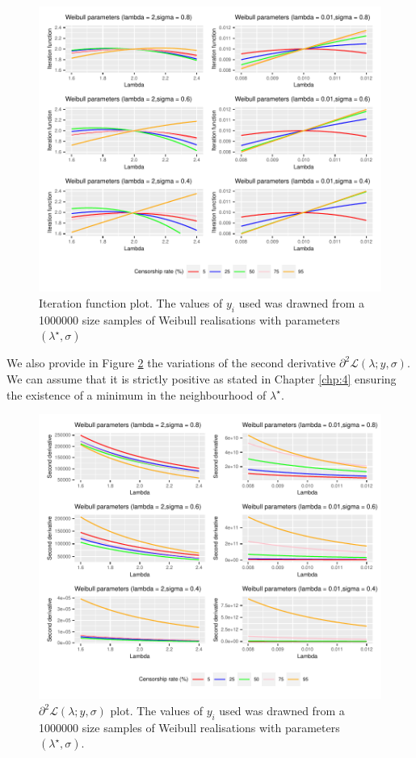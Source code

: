 \begin{appendices}
\begin{figure}[ht]
    \centering
    \includegraphics{figs/App/ite_function.pdf}
    \caption{Iteration function plot. The values of $y_i$ used was drawned from a 1000000 size samples of Weibull realisations with parameters $(\lambda^\star,\sigma)$}
    \label{fig:ite_func}
\end{figure}

We also provide in Figure \ref{fig:dll_func} the variations of the second derivative $\partial^2\mathcal{L}(\lambda;y,\sigma)$. We can assume that it is strictly positive as stated in Chapter \ref{chp:4} ensuring the existence of a minimum in the neighbourhood of $\lambda^\star$.  

\begin{figure}[ht]
    \centering
    \includegraphics{figs/App/dll_function.pdf}
    \caption{$\partial^2\mathcal{L}(\lambda;y,\sigma)$ plot. The values of $y_i$ used was drawned from a 1000000 size samples of Weibull realisations with parameters $(\lambda^\star,\sigma)$.}
    \label{fig:dll_func}
\end{figure}


\end{appendices}
